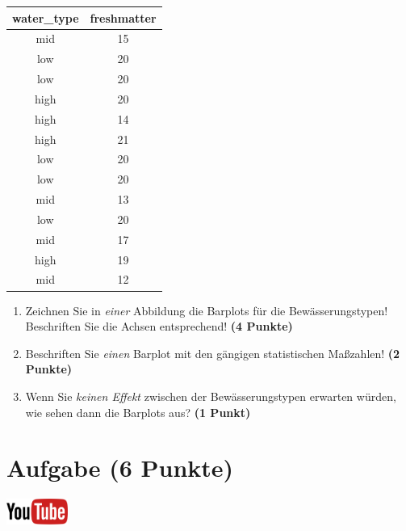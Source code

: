 \documentclass[a4paper, 10pt]{scrartcl}\usepackage[]{graphicx}\usepackage[]{xcolor}
\begin{document}
\begin{table}[!h]
\centering
\begin{tabular}{cc}
\toprule
water\_type & freshmatter\\
\midrule
mid & 15\\
low & 20\\
low & 20\\
high & 20\\
high & 14\\
\addlinespace
high & 21\\
low & 20\\
low & 20\\
mid & 13\\
low & 20\\
\addlinespace
mid & 17\\
high & 19\\
mid & 12\\
\bottomrule
\end{tabular}
\end{table}



\begin{enumerate}
\item Zeichnen Sie in \textit{einer} Abbildung die Barplots f{\"u}r die
  Bew{\"a}sserungstypen! Beschriften Sie die Achsen entsprechend!  \textbf{(4
    Punkte)}
\item Beschriften Sie \textit{einen} Barplot mit den g{\"a}ngigen
  statistischen Ma{\ss}zahlen! \textbf{(2 Punkte)}
\item Wenn Sie \textit{keinen Effekt} zwischen der Bew{\"a}sserungstypen
  erwarten w{\"u}rden, wie sehen dann die Barplots aus? \textbf{(1 Punkt)}
\end{enumerate} 
\clearpage

\section{Aufgabe \hfill (6 Punkte)}

\hfill\href{https://youtu.be/MiD42k4l5Ag}{\includegraphics[width =
  2cm]{img/youtube}}\\[1Ex]
\end{document}
